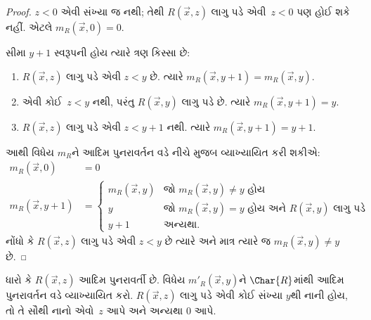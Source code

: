 \begin{proof}
$z < 0$ એવી સંખ્યા જ નથી; તેથી $R(\vec{x}, z)$ લાગુ પડે
એવી~$z < 0$ પણ હોઈ શકે નહીં. એટલે $m_R(\vec x, 0) = 0$.

સીમા $y + 1$ સ્વરૂપની હોય ત્યારે ત્રણ કિસ્સા છે:
\begin{enumerate}
\item $R(\vec{x}, z)$ લાગુ પડે એવી $z < y$ છે. ત્યારે
$m_R(\vec{x}, y+1) = m_R(\vec{x}, y)$.
\item એવી કોઈ~$z<y$ નથી, પરંતુ $R(\vec{x}, y)$ લાગુ પડે છે.
ત્યારે $m_R(\vec{x}, y+1) = y$.
\item $R(\vec{x}, z)$ લાગુ પડે એવી $z < y+1$ નથી. ત્યારે
$m_R(\vec{x}, y+1) = y+1$.
\end{enumerate}
આથી વિધેય $m_R$ને આદિમ પુનરાવર્તન વડે નીચે મુજબ વ્યાખ્યાયિત
કરી શકીએ:
\begin{align*}
m_R(\vec{x}, 0) & = 0\\
m_R(\vec{x}, y+1) & =
\begin{cases}
m_R(\vec{x}, y) & \text{જો $m_R(\vec x, y) \neq y$ હોય}\\
y & \text{જો $m_R(\vec x, y) = y$ હોય અને $R(\vec{x}, y)$ લાગુ પડે}\\
y+1 & \text{અન્યથા.}
\end{cases}
\end{align*}
નોંધો કે $R(\vec x, z)$ લાગુ પડે એવી $z<y$ છે ત્યારે અને માત્ર
ત્યારે જ $m_R(\vec x,
y) \neq y$ છે.
\end{proof}

\begin{prob}
ધારો કે $R(\vec x, z)$ આદિમ પુનરાવર્તી છે. વિધેય
$m'_R(\vec{x}, y)$ને $\Char{R}$માંથી આદિમ પુનરાવર્તન વડે
વ્યાખ્યાયિત કરો. $R(\vec{x}, z)$ લાગુ પડે એવી કોઈ સંખ્યા $y$થી
નાની હોય, તો તે સૌથી નાનો એવો~$z$ આપે અને અન્યથા $0$ આપે.
\end{prob}
\endgroup


\begingroup
\makeatletter{}\makeatother

\label{guunit:OLP-0219}


